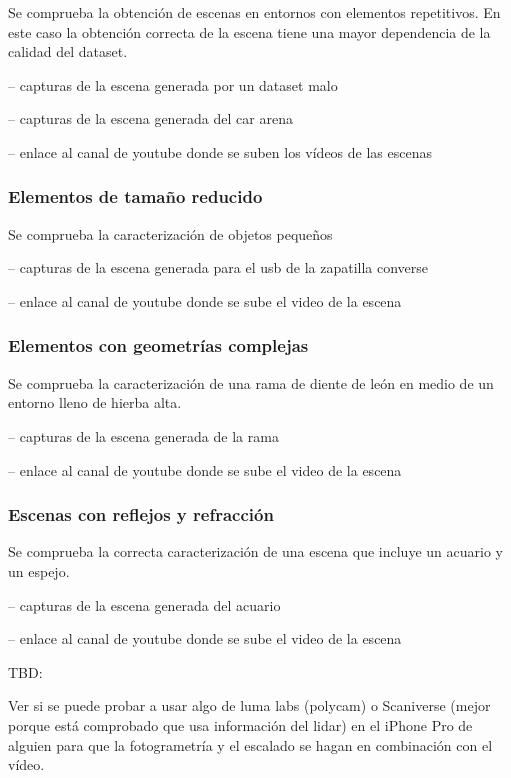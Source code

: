 \documentclass[a4paper, 12pt, spanish, twoside]{article}
\begin{document}
Se comprueba la obtención de escenas en entornos con elementos repetitivos. En este caso la obtención correcta de la escena tiene una mayor dependencia de la calidad del dataset. 

-- capturas de la escena generada por un dataset malo 

-- capturas de la escena generada del car arena 

-- enlace al canal de youtube donde se suben los vídeos de las escenas 

\subsubsection {Elementos de tamaño reducido} \label{sec:implementacion:limites-3dgs:reducido}

Se comprueba la caracterización de objetos pequeños 

-- capturas de la escena generada para el usb de la zapatilla converse 

-- enlace al canal de youtube donde se sube el video de la escena 

\subsubsection {Elementos con geometrías complejas} \label{sec:implementacion:limites-3dgs:complejas}

Se comprueba la caracterización de una rama de diente de león en medio de un entorno lleno de hierba alta. 

-- capturas de la escena generada de la rama 

-- enlace al canal de youtube donde se sube el video de la escena 

\subsubsection {Escenas con reflejos y refracción} \label{sec:implementacion:limites-3dgs:reflejos}

Se comprueba la correcta caracterización de una escena que incluye un acuario y un espejo. 

-- capturas de la escena generada del acuario 

-- enlace al canal de youtube donde se sube el video de la escena 

TBD: 

Ver si se puede probar a usar algo de luma labs (polycam) o Scaniverse (mejor porque está comprobado que usa información del \acrshort{lidar}) en el iPhone Pro de alguien para que la fotogrametría y el escalado se hagan en combinación con el vídeo.  
\end{document}
